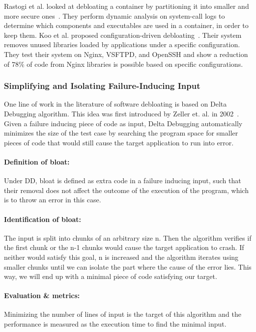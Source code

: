 Rastogi et al. looked at debloating a container by partitioning it into smaller and more secure ones~\cite{rastogi2017Cimplifier}. They perform dynamic analysis on system-call logs to determine which components and executables are used in a container, in order to keep them. Koo et al. proposed configuration-driven debloating~\cite{Koo:2019:CSD:3301417.3312501}. Their system removes unused libraries loaded by applications under a specific configuration. They test their system on Nginx, VSFTPD, and OpenSSH and show a reduction of 78\% of code from Nginx libraries is possible based on specific configurations.

\subsubsection{Simplifying and Isolating Failure-Inducing Input}
One line of work in the literature of software debloating is based on Delta Debugging algorithm. This idea was first introduced by Zeller et. al. in 2002~\cite{zeller2002Delta}.
Given a failure inducing piece of code as input, Delta Debugging automatically minimizes the size of the test case by searching the program space for smaller pieces of code that would still cause the target application to run into error.

\paragraph{Definition of bloat:} Under DD, bloat is defined as extra code in a failure inducing input, such that their removal does not affect the outcome of the execution of the program, which is to throw an error in this case.
\paragraph{Identification of bloat:} The input is split into chunks of an arbitrary size n. Then the algorithm verifies if the first chunk or the n-1 chunks would cause the target application to crash. If neither would satisfy this goal, n is increased and the algorithm iterates using smaller chunks until we can isolate the part where the cause of the error lies. This way, we will end up with a minimal piece of code satisfying our target.
\paragraph{Evaluation \& metrics:} Minimizing the number of lines of input is the target of this algorithm and the performance is measured as the execution time to find the minimal input.

